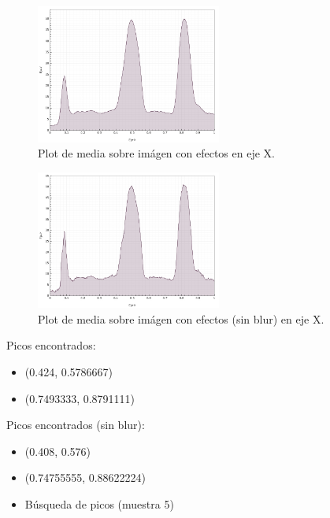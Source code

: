 \begin{figure}[H]
	\vspace{-0.2cm}
	\centering
	\includegraphics[width=230px]{imagenes-jtlc/experimento/search-peaks/4/plot-x}
	\centering
	\caption{Plot de media sobre im\'agen con efectos en eje X.}
	\label{fig:sp-4-plot-x-no-blur---repetido}
	\vspace{-0.15cm}
\end{figure}
\begin{figure}[H]
	\vspace{-0.2cm}
	\centering
	\includegraphics[width=230px]{imagenes-jtlc/experimento/search-peaks/4/plot-x-no-blur}
	\centering
	\caption{Plot de media sobre im\'agen con efectos (sin blur) en eje X.}
	\label{fig:sp-4-plot-x-no-blur}
	\vspace{-0.15cm}
\end{figure}

Picos encontrados:
\begin{itemize}
	\addtolength{\itemindent}{1cm}
	\item (0.424, 0.5786667)
	\item (0.7493333, 0.8791111)
\end{itemize}

Picos encontrados (sin blur):
\begin{itemize}
	\addtolength{\itemindent}{1cm}
	\item (0.408, 0.576)
	\item (0.74755555, 0.88622224)
\end{itemize}
	
\newpage
\begin{itemize}
	\item B\'usqueda de picos (muestra 5)
\end{itemize}
\vspace{-0.5cm}


